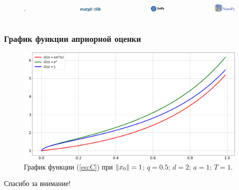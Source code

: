 \documentclass{beamer}
\DeclarePairedDelimiter{\norm}{\lVert}{\rVert}
\begin{document}
\begin{frame}
\begin{columns}
            \begin{figure}
                \includegraphics[width=0.5\linewidth]{python-logo}
            \end{figure}
            \begin{figure}
                \includegraphics[width=0.5\linewidth]{matplotlib-logo}
            \end{figure}
            \begin{figure}
                \includegraphics[width=0.5\linewidth]{scipy-logo}
            \end{figure}
            \begin{figure}
                \includegraphics[width=0.5\linewidth]{numpy-logo}
            \end{figure}

        \end{columns}
    \end{frame}

    \begin{frame}
        \frametitle{График функции априорной оценки}
        \begin{figure}
            \includegraphics[width=0.75\linewidth]{plot}
            \caption{График функции (\ref{eq:C}) при $\norm{x_0} = 1$; $q = 0.5$; $d = 2$; $a = 1$; $T = 1$.}
        \end{figure}
    \end{frame}

    \begin{frame}
        \begin{block}{}
            \centerline{\color{blue}Спасибо за внимание!}
        \end{block}
    \end{frame}
\end{document}
